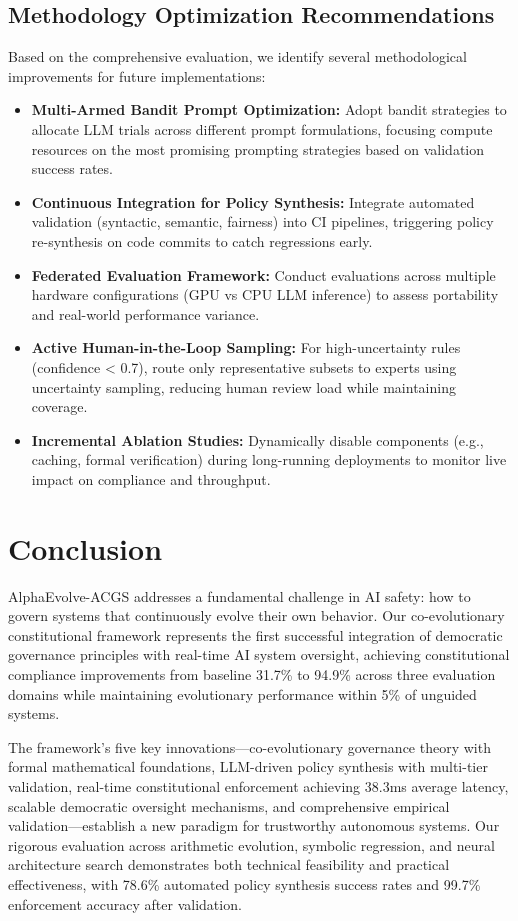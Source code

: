\documentclass[sigconf,natbib]{acmart}
\begin{document}
\subsection{Methodology Optimization Recommendations}
\label{subsec:methodology_optimization}
Based on the comprehensive evaluation, we identify several methodological improvements for future implementations:

\begin{itemize}
    \item \textbf{Multi-Armed Bandit Prompt Optimization:} Adopt bandit strategies to allocate LLM trials across different prompt formulations, focusing compute resources on the most promising prompting strategies based on validation success rates.
    \item \textbf{Continuous Integration for Policy Synthesis:} Integrate automated validation (syntactic, semantic, fairness) into CI pipelines, triggering policy re-synthesis on code commits to catch regressions early.
    \item \textbf{Federated Evaluation Framework:} Conduct evaluations across multiple hardware configurations (GPU vs CPU LLM inference) to assess portability and real-world performance variance.
    \item \textbf{Active Human-in-the-Loop Sampling:} For high-uncertainty rules (confidence < 0.7), route only representative subsets to experts using uncertainty sampling, reducing human review load while maintaining coverage.
    \item \textbf{Incremental Ablation Studies:} Dynamically disable components (e.g., caching, formal verification) during long-running deployments to monitor live impact on compliance and throughput.
\end{itemize}

\section{Conclusion}
\label{sec:conclusion}
AlphaEvolve-ACGS addresses a fundamental challenge in AI safety: how to govern systems that continuously evolve their own behavior. Our co-evolutionary constitutional framework represents the first successful integration of democratic governance principles with real-time AI system oversight, achieving constitutional compliance improvements from baseline 31.7\% to 94.9\% across three evaluation domains while maintaining evolutionary performance within 5\% of unguided systems.

The framework's five key innovations—co-evolutionary governance theory with formal mathematical foundations, LLM-driven policy synthesis with multi-tier validation, real-time constitutional enforcement achieving 38.3ms average latency, scalable democratic oversight mechanisms, and comprehensive empirical validation—establish a new paradigm for trustworthy autonomous systems. Our rigorous evaluation across arithmetic evolution, symbolic regression, and neural architecture search demonstrates both technical feasibility and practical effectiveness, with 78.6\% automated policy synthesis success rates and 99.7\% enforcement accuracy after validation.
\end{document}
